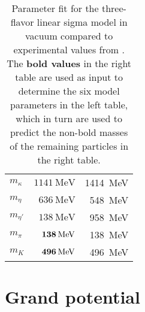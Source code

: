 \begin{table}
\begin{tabular}{ l r r }
	$m_\kappa$        & $\SI{1141}{\mega\electronvolt}$         & \SI{1414}{\mega\electronvolt}                    \\
	$m_\eta$          & $\SI{636}{\mega\electronvolt}$          & \SI{548}{\mega\electronvolt}                     \\
	$m_{\eta'}$       & $\SI{138}{\mega\electronvolt}$          & \SI{958}{\mega\electronvolt}                     \\
	$m_\pi$           & $\textbf{\SI{138}{\mega\electronvolt}}$ & \SI{138}{\mega\electronvolt}                     \\
	$m_K$             & $\textbf{\SI{496}{\mega\electronvolt}}$ & \SI{496}{\mega\electronvolt}                     \\
	\bottomrule
\end{tabular}
\caption{\label{tab:lsm3f:parameters}%
Parameter fit for the three-flavor linear sigma model in vacuum compared to experimental values from \cite{ref:pdg_review_2021}.
The \textbf{bold values} in the right table are used as input to determine the six model parameters in the left table,
which in turn are used to predict the non-bold masses of the remaining particles in the right table.
}
\end{table}


\section{Grand potential}

